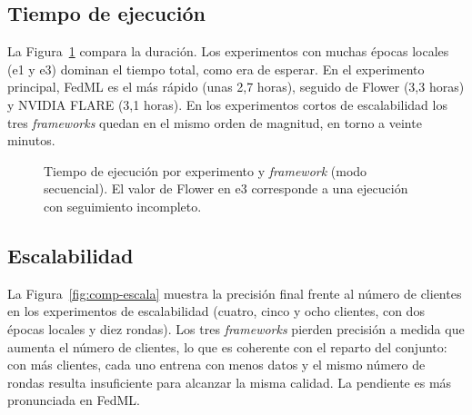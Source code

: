\subsection{Tiempo de ejecución}\label{sec:comp-tiempo}

La Figura~\ref{fig:comp-tiempo} compara la duración. Los experimentos con muchas épocas locales
(e1 y e3) dominan el tiempo total, como era de esperar. En el experimento principal, FedML es el
más rápido (unas 2,7 horas), seguido de Flower (3,3 horas) y NVIDIA FLARE (3,1 horas). En los
experimentos cortos de escalabilidad los tres \textit{frameworks} quedan en el mismo orden de
magnitud, en torno a veinte minutos.

\begin{figure}[htbp]
  \centering
  \caption{Tiempo de ejecución por experimento y \textit{framework} (modo secuencial). El valor
  de Flower en e3 corresponde a una ejecución con seguimiento incompleto.}
  \label{fig:comp-tiempo}
\end{figure}

\subsection{Escalabilidad}\label{sec:comp-escalabilidad}

La Figura~\ref{fig:comp-escala} muestra la precisión final frente al número de clientes en los
experimentos de escalabilidad (cuatro, cinco y ocho clientes, con dos épocas locales y diez
rondas). Los tres \textit{frameworks} pierden precisión a medida que aumenta el número de
clientes, lo que es coherente con el reparto del conjunto: con más clientes, cada uno entrena con
menos datos y el mismo número de rondas resulta insuficiente para alcanzar la misma calidad. La
pendiente es más pronunciada en FedML.


